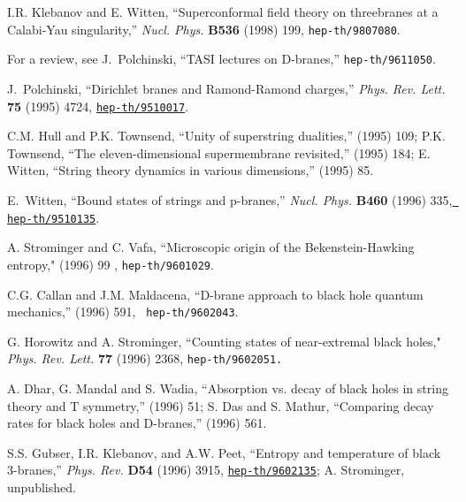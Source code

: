 \begin{thebibliography}{99}
I.R. Klebanov and E. Witten,
``Superconformal field theory on threebranes 
at a Calabi-Yau singularity,'' {\em Nucl. Phys.} {\bf B536} (1998) 199,
{{\tt hep-th/9807080}}.

For a review, see J.~Polchinski, ``TASI lectures on D-branes,''
{\tt hep-th/9611050}.

J.~Polchinski, ``Dirichlet branes and Ramond-Ramond charges,'' {\em Phys. Rev.
  Lett.} {\bf 75} (1995) 4724,
  \href{http://xxx.lanl.gov/abs/hep-th/9510017}{{\tt hep-th/9510017}}.

C.M. Hull and P.K. Townsend, ``Unity of superstring dualities,''
 (1995) 109;
P.K. Townsend, ``The eleven-dimensional supermembrane
    revisited,'' (1995) 184;
E. Witten, ``String theory dynamics in various dimensions,''
 (1995) 85.

E.~Witten, ``Bound states of strings and p-branes,'' {\em Nucl. Phys.} {\bf
  B460} (1996) 335, \href{http://xxx.lanl.gov/abs/hep-th/9510135}{{\tt
  hep-th/9510135}}.


A. Strominger   and C. Vafa,
``Microscopic origin of the Bekenstein-Hawking \\ entropy,"
 (1996) 99 , {\tt hep-th/9601029}.

C.G. Callan and J.M. Maldacena, ``D-brane approach to black
hole quantum \\ mechanics,''  (1996) 591, {\tt
hep-th/9602043}.

 G. Horowitz  and A.  Strominger,
``Counting states of near-extremal black holes,"
   {\em Phys. Rev. Lett.}  {\bf 77} (1996) 2368,
{\tt hep-th/9602051.}

A. Dhar, G. Mandal and S. Wadia, ``Absorption vs. decay of black holes
in string theory and T symmetry,''  (1996) 51;
S. Das and S. Mathur, ``Comparing decay rates
    for black holes and D-branes,''  (1996) 561.


S.S. Gubser, I.R. Klebanov, and A.W. Peet, ``Entropy and temperature of
  black 3-branes,'' {\em Phys. Rev.} {\bf D54} (1996) 3915,
  \href{http://xxx.lanl.gov/abs/hep-th/9602135}{{\tt hep-th/9602135}};
A. Strominger, unpublished.


\end{thebibliography}
